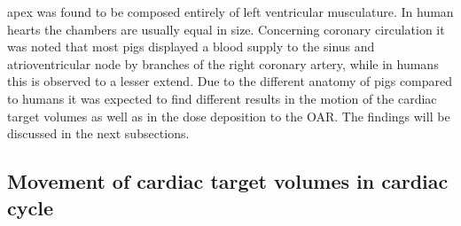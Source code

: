 \documentclass[type=dr, dr=rernat, accentcolor=tud7b,colorbacktitle, bigchapter, openright, twoside, 12pt ]{tudthesis}
\begin{document}
apex was found to be composed entirely of left ventricular musculature. In human hearts the chambers are usually equal in size. 
Concerning coronary circulation it was noted that most pigs displayed a blood supply to the sinus and atrioventricular node by branches 
of the right coronary artery, while in humans this is observed to a lesser extend.\newline
\newline
Due to the different anatomy of pigs compared to humans it was expected to find different results in the motion of the cardiac target volumes 
as well as in the dose deposition to the OAR. The findings will be discussed in the next subsections. 

\subsection{Movement of cardiac target volumes in cardiac cycle}
\end{document}
